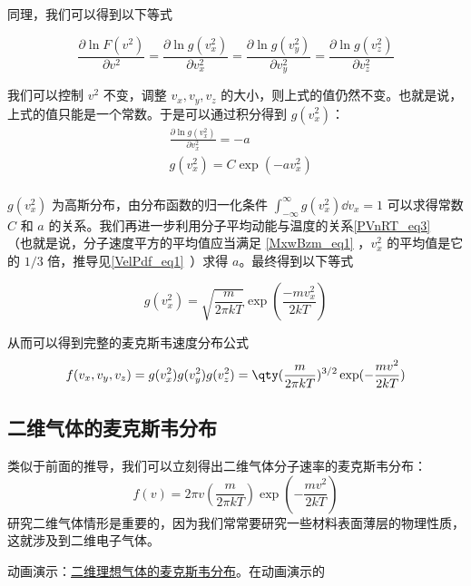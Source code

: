 同理，我们可以得到以下等式

\begin{equation}
\frac{\partial \ln F(v^2)}{\partial v^2}=\frac{\partial \ln g(v_x^2)}{\partial v_x^2}=\frac{\partial \ln g(v_y^2)}{\partial v_y^2}=\frac{\partial \ln g(v_z^2)}{\partial v_z^2}
\end{equation}

我们可以控制 $v^2$ 不变，调整 $v_x,v_y,v_z$ 的大小，则上式的值仍然不变。也就是说，上式的值只能是一个常数。于是可以通过积分得到 $g(v_x^2)$：
\begin{equation}
\begin{aligned}
&\frac{\partial \ln g(v_x^2)}{\partial v_x^2} = -a\\
&g(v_x^2)=C\exp(-av_x^2)\\
\end{aligned}
\end{equation}

$g(v_x^2)$ 为高斯分布，由分布函数的归一化条件 $\int_{-\infty}^\infty g(v_x^2)\dd v_x=1$ 可以求得常数 $C$ 和 $a$ 的关系。我们再进一步利用分子平均动能与温度的关系\autoref{PVnRT_eq3}~ （也就是说，分子速度平方的平均值应当满足 \autoref{MxwBzm_eq1} ，$v_x^2$ 的平均值是它的 $1/3$ 倍，推导见\autoref{VelPdf_eq1}~）求得 $a$。最终得到以下等式

\begin{equation}
g(v_x^2)=\sqrt{\frac{m}{2\pi kT}}\exp(\frac{-mv_x^2}{2kT})
\end{equation}

从而可以得到完整的麦克斯韦速度分布公式
\begin{equation}
f(v_x,v_y,v_z)=g(v_x^2)g(v_y^2)g(v_z^2)=\qty(\frac{m}{2\pi k T})^{3/2}\exp(-\frac{mv^2}{2kT})
\end{equation}

\subsection{二维气体的麦克斯韦分布}
类似于前面的推导，我们可以立刻得出二维气体分子速率的麦克斯韦分布：
\begin{equation}
f(v)=2\pi v\left(\frac{m}{2\pi kT}\right)\exp\left(-\frac{m v^2}{2kT}\right)
\end{equation}
研究二维气体情形是重要的，因为我们常常要研究一些材料表面薄层的物理性质，这就涉及到二维电子气体。

动画演示：\href{https://wuli.wiki/apps/Maxwell2D/physics.html}{二维理想气体的麦克斯韦分布}。在动画演示的